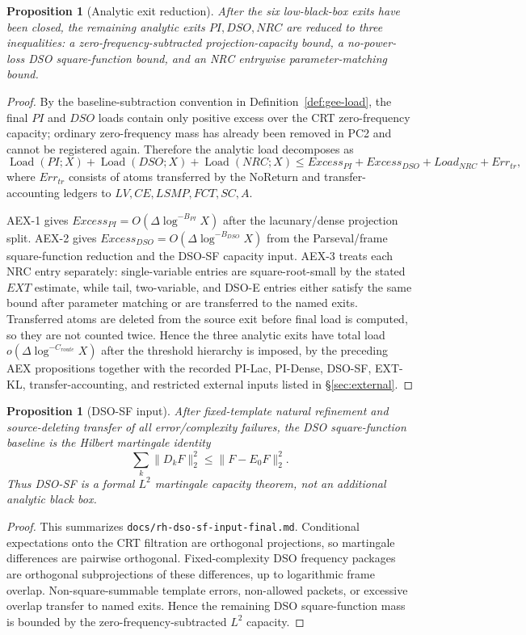 \documentclass[11pt]{article}
\newtheorem{proposition}[theorem]{Proposition}
\theoremstyle{definition}
\begin{document}
\begin{proposition}[Analytic exit reduction]
After the six low-black-box exits have been closed, the remaining analytic exits $PI,DSO,NRC$ are reduced to three inequalities: a zero-frequency-subtracted projection-capacity bound, a no-power-loss DSO square-function bound, and an NRC entrywise parameter-matching bound.
\end{proposition}
\begin{proof}
By the baseline-subtraction convention in Definition~\ref{def:gee-load}, the final $PI$ and $DSO$ loads contain only positive excess over the CRT zero-frequency capacity; ordinary zero-frequency mass has already been removed in PC2 and cannot be registered again.  Therefore the analytic load decomposes as
\[
  \operatorname{Load}(PI;X)+\operatorname{Load}(DSO;X)+\operatorname{Load}(NRC;X)
  \le Excess_{PI}+Excess_{DSO}+Load_{NRC}+Err_{tr},
\]
where $Err_{tr}$ consists of atoms transferred by the NoReturn and transfer-accounting ledgers to $LV,CE,LSMP,FCT,SC,A$.

AEX-1 gives $Excess_{PI}=O(\Delta\log^{-B_{PI}}X)$ after the lacunary/dense projection split.  AEX-2 gives $Excess_{DSO}=O(\Delta\log^{-B_{DSO}}X)$ from the Parseval/frame square-function reduction and the DSO-SF capacity input.  AEX-3 treats each NRC entry separately: single-variable entries are square-root-small by the stated $EXT$ estimate, while tail, two-variable, and DSO-E entries either satisfy the same bound after parameter matching or are transferred to the named exits.  Transferred atoms are deleted from the source exit before final load is computed, so they are not counted twice.  Hence the three analytic exits have total load $o(\Delta\log^{-C_{route}}X)$ after the threshold hierarchy is imposed, by the preceding AEX propositions together with the recorded PI-Lac, PI-Dense, DSO-SF, EXT-KL, transfer-accounting, and restricted external inputs listed in \S\ref{sec:external}.
\end{proof}



\begin{proposition}[DSO-SF input]
After fixed-template natural refinement and source-deleting transfer of all error/complexity failures, the DSO square-function baseline is the Hilbert martingale identity
\[
  \sum_k\|D_kF\|_2^2\le \|F-E_0F\|_2^2.
\]
Thus DSO-SF is a formal $L^2$ martingale capacity theorem, not an additional analytic black box.
\end{proposition}
\begin{proof}
This summarizes \texttt{docs/rh-dso-sf-input-final.md}.  Conditional expectations onto the CRT filtration are orthogonal projections, so martingale differences are pairwise orthogonal.  Fixed-complexity DSO frequency packages are orthogonal subprojections of these differences, up to logarithmic frame overlap.  Non-square-summable template errors, non-allowed packets, or excessive overlap transfer to named exits.  Hence the remaining DSO square-function mass is bounded by the zero-frequency-subtracted $L^2$ capacity.
\end{proof}
\end{document}
